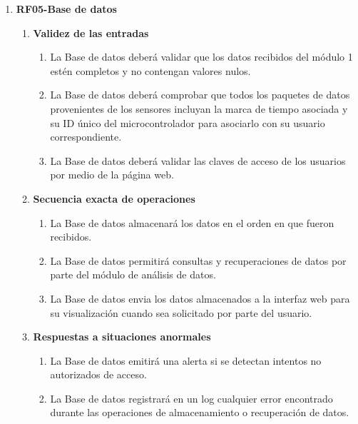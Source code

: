 \begin{enumerate}
\item \label{it:RF05} \textbf{RF05-Base de datos}
    \begin{enumerate}
            \item \textbf{Validez de las entradas}
                \begin{enumerate}
                    \item La Base de datos deberá validar que los datos recibidos del módulo 1 estén completos y no contengan valores nulos.
                    \item La Base de datos deberá comprobar que todos los paquetes de datos provenientes de los sensores incluyan la marca de tiempo asociada y su ID único del microcontrolador
                    para asociarlo con su usuario correspondiente.
                    \item La Base de datos deberá validar las claves de acceso de los usuarios por medio de la página web.
                \end{enumerate}   
            
            \item \textbf{Secuencia exacta de operaciones}
                \begin{enumerate}
                    \item La Base de datos almacenará los datos en el orden en que fueron recibidos.
                    \item La Base de datos permitirá consultas y recuperaciones de datos por parte del módulo de análisis de datos.
                    \item La Base de datos envia los datos almacenados a la interfaz web para su visualización cuando sea solicitado por parte del usuario.
                \end{enumerate}   
        
            \item \textbf{Respuestas a situaciones anormales}
                \begin{enumerate}
                    \item La Base de datos emitirá una alerta si se detectan intentos no autorizados de acceso.
                    \item La Base de datos registrará en un log cualquier error encontrado durante las operaciones de almacenamiento o recuperación de datos.
                \end{enumerate}   
       

\end{enumerate}
\end{enumerate}
